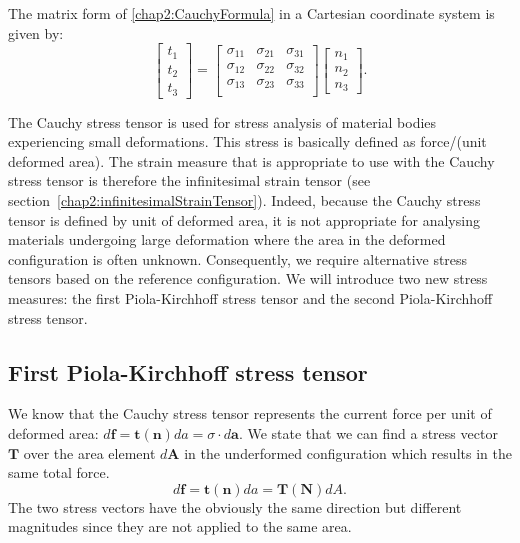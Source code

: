 The matrix form of \eqref{chap2:CauchyFormula} in a Cartesian coordinate system is given by:
\begin{equation}
	\begin{bmatrix}
		t_1 \\
		t_2 \\
		t_3
	\end{bmatrix}
= 
	\begin{bmatrix}
		\sigma_{11} & \sigma_{21} & \sigma_{31} \\
		\sigma_{12} & \sigma_{22} & \sigma_{32} \\
		\sigma_{13} & \sigma_{23} & \sigma_{33} \\
	\end{bmatrix}
	\begin{bmatrix}
		n_1 \\
		n_2 \\
		n_3
	\end{bmatrix}
	.
\end{equation}

The Cauchy stress tensor is used for stress analysis of material bodies experiencing small deformations. This stress is basically defined as force/(unit deformed area). The strain measure that is appropriate to use with the Cauchy stress tensor is \ON therefore \OFF the infinitesimal strain tensor (see section~\ref{chap2:infinitesimalStrainTensor}).  \ON Indeed, because the Cauchy stress tensor is defined by unit of deformed area, it is not appropriate for analysing materials undergoing large deformation where the area in the deformed configuration is often unknown. Consequently, we require alternative stress tensors based on the reference configuration. \OFF We will introduce two new stress measures: the first Piola-Kirchhoff stress tensor and the second Piola-Kirchhoff stress tensor.

	\subsection{First Piola-Kirchhoff stress tensor}\label{chap2:PiolaStress1}
We know that the Cauchy stress tensor represents the current force per unit of deformed area: $d\mathbf{f} = \mathbf{t}(\mathbf{n}) da = \sigma \cdot d\mathbf{a}$. \ON We state that we can find a stress vector $\mathbf{T}$ over the area element $d\mathbf{A}$ in the underformed configuration which \OFF results in the same total force.
\begin{equation}
\label{chap2:df}
d\mathbf{f} = \mathbf{t}(\mathbf{n}) da = \mathbf{T}(\mathbf{N}) dA.
\end{equation} 
The two stress vectors have the obviously the same direction but different magnitudes since they are not applied to the same area.

